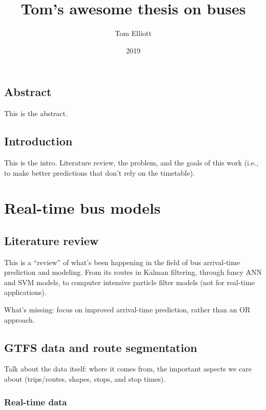 \documentclass[english]{MastersDoctoralThesis}\usepackage[]{graphicx}\usepackage[]{color}
\title{Tom's awesome thesis on buses}
\author{Tom Elliott}
\date{2019}
\begin{document}
\maketitle

\tableofcontents
\tabularnewline

\frontmatter

\chapter*{Abstract}

This is the abstract.

\mainmatter



\chapter{Introduction}

This is the intro. Literature review, the problem,
and the goals of this work (i.e., to make better predictions
that don't rely on the timetable).

\part{Real-time bus models}



\chapter{Literature review}

This is a ``review'' of what's been happening in the field of
bus arrival-time prediction and modeling.
From its routes in Kalman filtering,
through fancy ANN and SVM models,
to computer intensive particle filter models
(not for real-time applications).

What's missing: focus on improved arrival-time prediction,
rather than an OR approach.



\chapter{GTFS data and route segmentation}

Talk about the data itself: where it comes from,
the important aspects we care about
(trips/routes, shapes, stops, and stop times).


\section{Real-time data}
\end{document}
